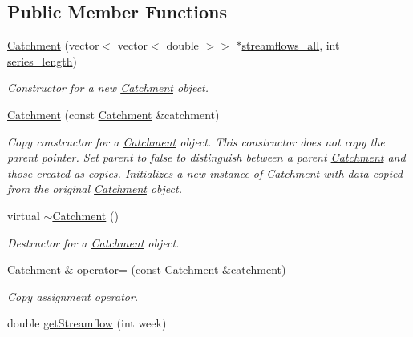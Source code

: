 \subsection*{Public Member Functions}
\begin{DoxyCompactItemize}
\item 
\mbox{\hyperlink{classCatchment_aafdee6ee868a8892314672abb119e60f}{Catchment}} (vector$<$ vector$<$ double $>$$>$ $\ast$\mbox{\hyperlink{classCatchment_a579ccda86831f286c19c76354e7125c3}{streamflows\+\_\+all}}, int \mbox{\hyperlink{classCatchment_a2d4994220f63b876348b4ce4892bc6d3}{series\+\_\+length}})
\begin{DoxyCompactList}\small\item\em Constructor for a new \mbox{\hyperlink{classCatchment}{Catchment}} object. \end{DoxyCompactList}\item 
\mbox{\hyperlink{classCatchment_ae311c4b2d857a8b5abc01f5317b04df2}{Catchment}} (const \mbox{\hyperlink{classCatchment}{Catchment}} \&catchment)
\begin{DoxyCompactList}\small\item\em Copy constructor for a \mbox{\hyperlink{classCatchment}{Catchment}} object. This constructor does not copy the parent pointer. Set parent to false to distinguish between a parent \mbox{\hyperlink{classCatchment}{Catchment}} and those created as copies. Initializes a new instance of \mbox{\hyperlink{classCatchment}{Catchment}} with data copied from the original \mbox{\hyperlink{classCatchment}{Catchment}} object. \end{DoxyCompactList}\item 
virtual \mbox{\hyperlink{classCatchment_ad12bc6d64d4bd5133ac1086a52e240b3}{$\sim$\+Catchment}} ()
\begin{DoxyCompactList}\small\item\em Destructor for a \mbox{\hyperlink{classCatchment}{Catchment}} object. \end{DoxyCompactList}\item 
\mbox{\hyperlink{classCatchment}{Catchment}} \& \mbox{\hyperlink{classCatchment_a5abab52eab9c05164f76e46954833989}{operator=}} (const \mbox{\hyperlink{classCatchment}{Catchment}} \&catchment)
\begin{DoxyCompactList}\small\item\em Copy assignment operator. \end{DoxyCompactList}\item 
double \mbox{\hyperlink{classCatchment_af4e8206ffab5c901e5e4cdd6136f73a1}{get\+Streamflow}} (int week)
$$
\end{DoxyCompactItemize}
